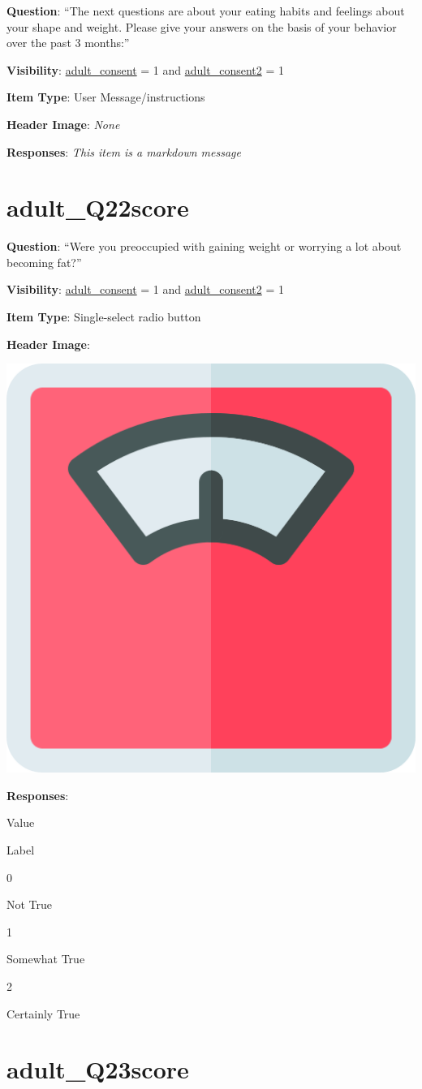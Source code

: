 \documentclass[]{book}
\begin{document}
\textbf{Question}: ``The next questions are about your eating habits and feelings about your shape and weight. Please give your answers on the basis of your behavior over the past 3 months:''

\textbf{Visibility}: \protect\hyperlink{adult_consent}{adult\_consent} = 1 and \protect\hyperlink{adult_consent2}{adult\_consent2} = 1

\textbf{Item Type}: User Message/instructions

\textbf{Header Image}: \emph{None}

\textbf{Responses}: \emph{This item is a markdown message}

\hypertarget{adult_q22score}{%
\section{adult\_Q22score}\label{adult_q22score}}

\textbf{Question}: ``Were you preoccupied with gaining weight or worrying a lot about becoming fat?''

\textbf{Visibility}: \protect\hyperlink{adult_consent}{adult\_consent} = 1 and \protect\hyperlink{adult_consent2}{adult\_consent2} = 1

\textbf{Item Type}: Single-select radio button

\textbf{Header Image}:

\begin{flushleft}\includegraphics[width=0.33\linewidth]{downloadFigs4latex_HBN_PMHS_Codebook/adult_Q22score_headerImg} \end{flushleft}

\textbf{Responses}:

Value

Label

0

Not True

1

Somewhat True

2

Certainly True

\hypertarget{adult_q23score}{%
\section{adult\_Q23score}\label{adult_q23score}}
\end{document}

